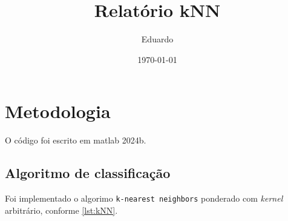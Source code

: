 \documentclass[a4paper,12pt]{article}
\begin{document}
\title{Relatório kNN}
\author{Eduardo}
\date{\today}
\maketitle

\section{Metodologia}
O código foi escrito em matlab 2024b.

\subsection{Algoritmo de classificação}
Foi implementado o algorimo \texttt{k-nearest neighbors} ponderado com \textit{kernel} arbitrário, conforme \ref{lst:kNN}.
\end{document}
